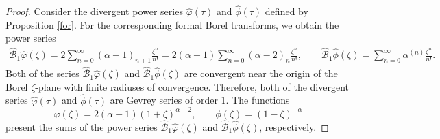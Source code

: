 \documentclass[10pt,a4paper]{amsart}
\numberwithin{equation}{section}
\begin{document}
 \begin{proof}
 Consider the divergent power series $\hat{\varphi}(\tau)$ and $\hat{\phi}(\tau)$ defined by Proposition \ref{for}. For the corresponding
 formal Borel transforms, we obtain the power series
 \begin{gather*}
 \hat{\mathcal{B}}_1 \hat{\varphi}(\zeta)
 =
 2 \sum_{n=0}^{\infty} (\alpha-1)_{n+1} \frac{\zeta^n}{n!}=
 2 (\alpha-1) \sum_{n=0}^{\infty} (\alpha-2)_n \frac{\zeta^n}{n!},\qquad
 \hat{\mathcal{B}}_1 \hat{\phi}(\zeta)
 =
 \sum_{n=0}^{\infty} \alpha^{(n)} \frac{\zeta^n}{n!} .
 \end{gather*}
 Both of the series $\hat{\mathcal{B}}_1 \hat{\varphi}(\zeta)$ and $\hat{\mathcal{B}}_1 \hat{\phi}(\zeta)$ are convergent near the origin
 of the Borel $\zeta$-plane with finite radiuses of convergence. Therefore, both of the divergent series $\hat{\varphi}(\tau)$
 and $\hat{\phi}(\tau)$ are Gevrey series of order 1. The functions
 \[
 \varphi(\zeta)=2 (\alpha-1) (1+\zeta)^{\alpha-2},\qquad
 \phi(\zeta)=(1-\zeta)^{-\alpha}
 \]
 present the sums of the power series $\hat{\mathcal{B}}_1 \hat{\varphi}(\zeta)$ and $\hat{\mathcal{B}}_1 \hat{\phi}(\zeta)$, respectively.


\end{proof}
\end{document}
